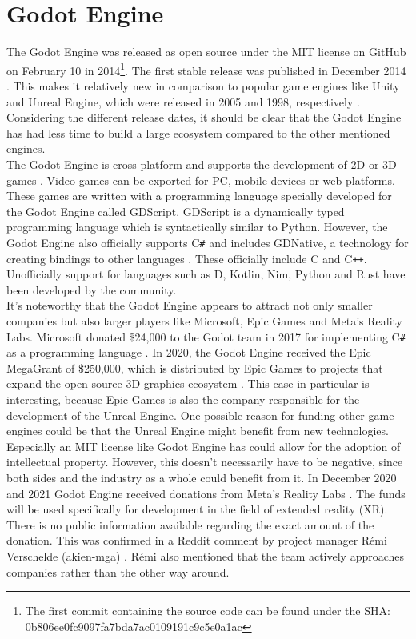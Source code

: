 \section{Godot Engine}
The Godot Engine was released as open source under the MIT license on GitHub on February 10 in 2014\footnote{The first commit containing the source code can be found under the SHA:\\ 0b806ee0fc9097fa7bda7ac0109191c9c5e0a1ac}\cite{godot-repository}.
The first stable release was published in December 2014 \cite{godot-release}.
This makes it relatively new in comparison to popular game engines like Unity and Unreal Engine, which were released in 2005 and 1998, respectively \cite{unity-release, unreal-release}.
Considering the different release dates, it should be clear that the Godot Engine has had less time to build a large ecosystem compared to the other mentioned engines.\\

The Godot Engine is cross-platform and supports the development of 2D or 3D games \cite{godot-engine}.
Video games can be exported for PC, mobile devices or web platforms.
These games are written with a programming language specially developed for the Godot Engine called GDScript.
GDScript is a dynamically typed programming language which is syntactically similar to Python.
However, the Godot Engine also officially supports C\texttt{\#} and includes GDNative, a technology for creating bindings to other languages \cite{godot-gdnative}.
These officially include C and C\texttt{++}.
Unofficially support for languages such as D, Kotlin, Nim, Python and Rust have been developed by the community.\\

It's noteworthy that the Godot Engine appears to attract not only smaller companies but also larger players like Microsoft, Epic Games and Meta's Reality Labs.
Microsoft donated \$24,000 to the Godot team in 2017 for implementing C\texttt{\#} as a programming language \cite{godot-csharp}.
In 2020, the Godot Engine received the Epic MegaGrant of \$250,000, which is distributed by Epic Games to projects that expand the open source 3D graphics ecosystem \cite{godot-megagrant}.
This case in particular is interesting, because Epic Games is also the company responsible for the development of the Unreal Engine.
One possible reason for funding other game engines could be that the Unreal Engine might benefit from new technologies.
Especially an MIT license like Godot Engine has could allow for the adoption of intellectual property. 
However, this doesn't necessarily have to be negative, since both sides and the industry as a whole could benefit from it.
In December 2020 and 2021 Godot Engine received donations from Meta's Reality Labs \cite{godot-facebook-reality, godot-meta-reality}.
The funds will be used specifically for development in the field of extended reality (XR).
There is no public information available regarding the exact amount of the donation.
This was confirmed in a Reddit comment by project manager Rémi Verschelde (akien-mga) \cite{reddit-companies-akien}.
Rémi also mentioned that the team actively approaches companies rather than the other way around.
